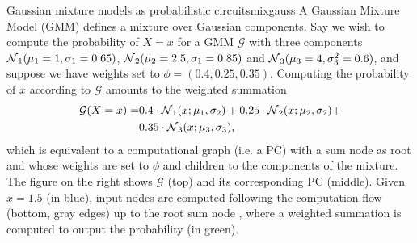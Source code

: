 \newcommand\mone{1}%
\newcommand\sone{0.65}%
\newcommand\mtwo{2.5}%
\newcommand\stwo{0.85}%
\newcommand\mthr{4}%
\newcommand\sthr{0.6}%
\begin{example}[sidebyside,lefthand width=0.55\textwidth]{Gaussian mixture models as probabilistic circuits}{mixgauss}
  A Gaussian Mixture Model (GMM) defines a mixture over Gaussian components. Say we wish to compute
  the probability of $X=x$ for a GMM $\mathcal{G}$ with three components
  $\gaussian_1(\mu_1=\mone,\sigma_1=\sone)$, $\gaussian_2(\mu_2=\mtwo, \sigma_1=\stwo)$ and
  $\gaussian_3(\mu_3=\mthr,\sigma^2_3=\sthr)$, and suppose we have weights set to
  $\phi=(0.4,0.25,0.35)$. Computing the probability of $x$ according to $\mathcal{G}$ amounts to
  the weighted summation
  \begin{align*}
    \mathcal{G}(X=x)=&0.4\cdot\operatorname{\mathcal{N}}_1(x;\mu_1,\sigma_2)+0.25\cdot\operatorname{\mathcal{N}}_2(x;\mu_2,\sigma_2)+\\
                     &0.35\cdot\operatorname{\mathcal{N}}_3(x;\mu_3,\sigma_3),
  \end{align*}
  which is equivalent to a computational graph (i.e. a PC) with a sum node as root and whose
  weights are set to $\phi$ and children to the components of the mixture. The figure on the right
  shows $\mathcal{G}$ (top) and its corresponding PC (middle). Given $x=1.5$ (in blue), input nodes
  are computed following the computation flow (bottom, gray edges) up to the root sum node
  \inode[fill=boxred!70]{\newSumNode}, where a weighted summation is computed to output the
  probability (in green).


\end{example}
